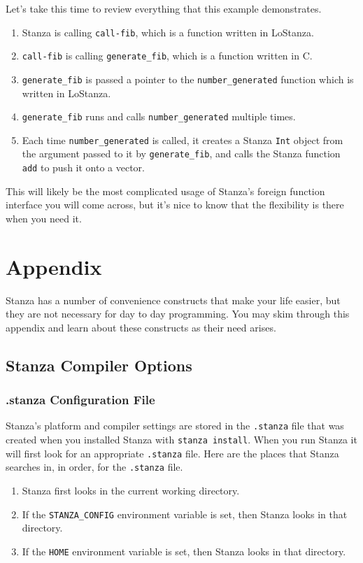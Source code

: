 \documentclass[10pt,oneside]{book}
\begin{document}
Let's take this time to review everything that this example demonstrates.
\begin{enumerate}
\item Stanza is calling \texttt{\frenchspacing call-fib}, which is a function written in LoStanza.
\item  \texttt{\frenchspacing call-fib} is calling \texttt{\frenchspacing generate\_fib}, which is a function written in C.
\item  \texttt{\frenchspacing generate\_fib} is passed a pointer to the \texttt{\frenchspacing number\_generated} function which is written in LoStanza.
\item  \texttt{\frenchspacing generate\_fib} runs and calls \texttt{\frenchspacing number\_generated} multiple times.
\item Each time \texttt{\frenchspacing number\_generated} is called, it creates a Stanza \texttt{\frenchspacing Int} object from the argument passed to it by \texttt{\frenchspacing generate\_fib}, and calls the Stanza function \texttt{\frenchspacing add} to push it onto a vector.
\end{enumerate}

This will likely be the most complicated usage of Stanza's foreign function interface you will come across, but it's nice to know that the flexibility is there when you need it.

\chapter{Appendix}
Stanza has a number of convenience constructs that make your life easier, but they are not necessary for day to day programming. You may skim through this appendix and learn about these constructs as their need arises.

\section{Stanza Compiler Options}
\subsection*{.stanza Configuration File}
Stanza's platform and compiler settings are stored in the \texttt{\frenchspacing .stanza} file that was created when you installed Stanza with \texttt{\frenchspacing stanza install}. When you run Stanza it will first look for an appropriate \texttt{\frenchspacing .stanza} file. Here are the places that Stanza searches in, in order, for the \texttt{\frenchspacing .stanza} file.
\begin{enumerate}
\item Stanza first looks in the current working directory.
\item If the \texttt{\frenchspacing STANZA\_CONFIG} environment variable is set, then Stanza looks in that directory.
\item If the \texttt{\frenchspacing HOME} environment variable is set, then Stanza looks in that directory.
\end{enumerate}
\end{document}

